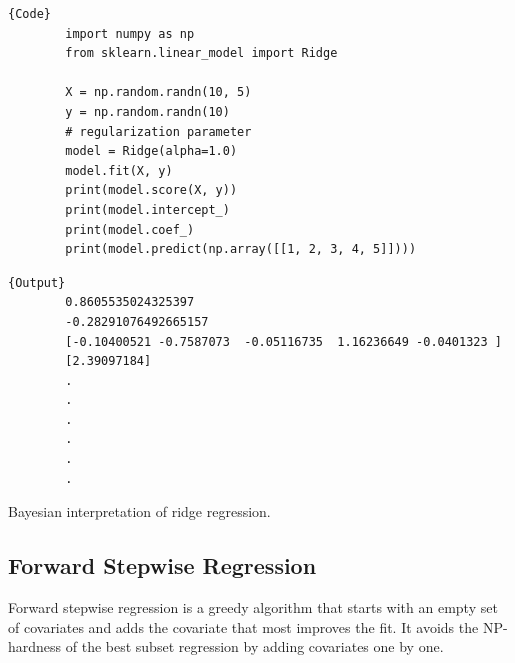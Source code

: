 \documentclass{article}
\begin{document}
    \begin{code}
      \noindent\begin{minipage}{.6\textwidth}
      \begin{lstlisting}[]{Code}
        import numpy as np 
        from sklearn.linear_model import Ridge  

        X = np.random.randn(10, 5) 
        y = np.random.randn(10)
        # regularization parameter
        model = Ridge(alpha=1.0)  
        model.fit(X, y) 
        print(model.score(X, y))  
        print(model.intercept_)
        print(model.coef_) 
        print(model.predict(np.array([[1, 2, 3, 4, 5]]))) 
      \end{lstlisting}
      \end{minipage}
      \hfill
      \begin{minipage}{.39\textwidth}
      \begin{lstlisting}[]{Output}
        0.8605535024325397
        -0.28291076492665157
        [-0.10400521 -0.7587073  -0.05116735  1.16236649 -0.0401323 ]
        [2.39097184]
        .
        .
        .
        .
        .
        .
      \end{lstlisting}
      \end{minipage}
    \end{code}

    \begin{question}[To Do]
      Bayesian interpretation of ridge regression. 
    \end{question}

  \subsection{Forward Stepwise Regression} 

    Forward stepwise regression is a greedy algorithm that starts with an empty set of covariates and adds the covariate that most improves the fit. It avoids the NP-hardness of the best subset regression by adding covariates one by one. 
\end{document}
